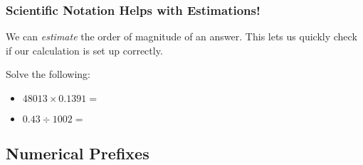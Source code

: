 \documentclass[notes=only]{beamer}
\begin{document}
%
%
%	

\begin{frame}
	\frametitle{Scientific Notation Helps with Estimations!}

	We can \emph{estimate} the order of magnitude of an answer. This lets us
	quickly check if our calculation is set up correctly.

	\bigskip

	\begin{example}
	Solve the following:
		\begin{itemize}
			\item $48013 \times 0.1391 =$

				\bigskip

			\item $0.43 \div 1002 =$
		\end{itemize}
	\end{example}
\end{frame}



\subsection{Numerical Prefixes}
\end{document}
